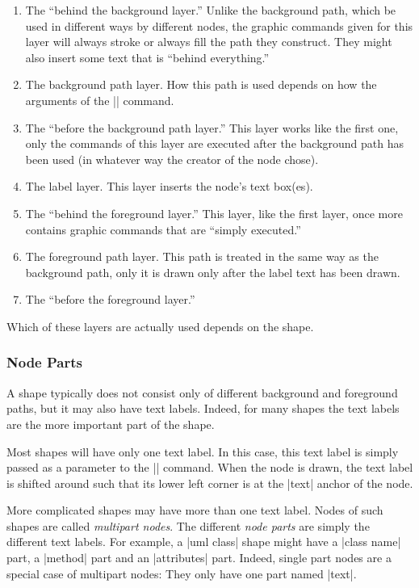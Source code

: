 \begin{enumerate}
\item
  The ``behind the background layer.'' Unlike the background path,
  which be used in different ways by different nodes, the graphic
  commands given for this layer will always stroke or
  always fill the path they construct. They might also insert some
  text that is ``behind everything.''
\item
  The background path layer. How this path is used depends on how the
  arguments of the |\pgfnode| command.
\item
  The ``before the background path layer.'' This layer works like the
  first one, only the commands of this layer are executed after the
  background path has been used (in whatever way the creator of the
  node chose).
\item
  The label layer. This layer inserts the node's text box(es).
\item
  The ``behind the foreground layer.'' This layer, like the
  first layer, once more contains graphic commands that are ``simply
  executed.''
\item
  The foreground path layer. This path is treated in the same way as the
  background path, only it is drawn only after the label text has been
  drawn.
\item
  The ``before the foreground layer.''
\end{enumerate}

Which of these layers are actually used depends on the shape.



\subsubsection{Node Parts}

A shape typically does not consist only of different background and
foreground paths, but it may also have text labels. Indeed, for many
shapes the text labels are the more important part of the shape.

Most shapes will have only one text label. In this case, this text
label is simply passed as a parameter to the |\pgfnode| command. When
the node is drawn, the text label is shifted around such that its
lower left corner is at the |text| anchor of the node.

More complicated shapes may have more than one text label. Nodes of
such shapes are called \emph{multipart nodes}. The different
\emph{node parts} are simply the different text labels. For example, a
|uml class| shape might have a |class name| part, a |method| part and
an |attributes| part. Indeed, single part nodes are a special case of
multipart nodes: They only have one part named |text|.

